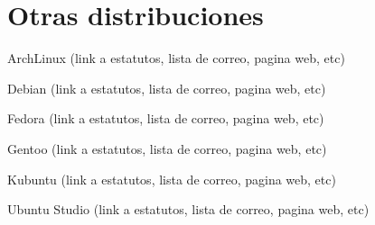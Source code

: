 \documentclass[spanish]{beamer}
\begin{document}
\section{Otras distribuciones}
\begin{frame}{ArchLinux}
(link a estatutos, lista de correo, pagina web, etc)
\end{frame}

\begin{frame}{Debian}
(link a estatutos, lista de correo, pagina web, etc)
\end{frame}

\begin{frame}{Fedora}
(link a estatutos, lista de correo, pagina web, etc)
\end{frame}

\begin{frame}{Gentoo}
(link a estatutos, lista de correo, pagina web, etc)
\end{frame}

\begin{frame}{Kubuntu}
(link a estatutos, lista de correo, pagina web, etc)
\end{frame}

\begin{frame}{Ubuntu Studio}
(link a estatutos, lista de correo, pagina web, etc)
\end{frame}
\end{document}
